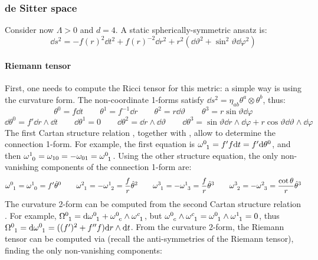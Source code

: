 \subsubsection{de Sitter space}
\label{ssec:dS-space}

Consider now $ \Lambda > 0 $ and $ d = 4 $. A static spherically-symmetric ansatz is:
\begin{equation*}
  \dd s^2 = - f(r)^2 \dd t^2 + f(r)^{-2} \dd r^2 + r^2 (\dd \vartheta^2 + \sin^2 \vartheta \dd \varphi^2)
\end{equation*}

\paragraph{Riemann tensor}

First, one needs to compute the Ricci tensor for this metric: a simple way is using the curvature form. The non-coordinate 1-forms satisfy $ \dd s^2 = \eta_{ab} \theta^a \otimes \theta^b $, thus:
\begin{equation*}
  \theta^0 = f \dd t
  \qquad
  \theta^1 = f^{-1} \dd r
  \qquad
  \theta^2 = r \dd \vartheta
  \qquad
  \theta^3 = r \sin \vartheta \dd \varphi
\end{equation*}
\begin{equation*}
  \dd\theta^0 = f' \dd r \wedge \dd t
  \qquad
  \dd\theta^1 = 0
  \qquad
  \dd\theta^2 = \dd r \wedge \dd \vartheta
  \qquad
  \dd\theta^3 = \sin \vartheta \dd r \wedge \dd \varphi + r \cos \vartheta \dd \vartheta \wedge \dd \varphi
\end{equation*}
The first Cartan structure relation , together with , allow to determine the connection 1-form. For example, the first equation is $ \tensor{\omega}{^0_1} = f' f \dd t = f' \dd \theta^0 $, and then $ \tensor{\omega}{^1_0} = \omega_{10} = - \omega_{01} = \tensor{\omega}{^0_1} $. Using the other structure equation, the only non-vanishing components of the connection 1-form are:
\begin{equation*}
  \tensor{\omega}{^0_1} = \tensor{\omega}{^1_0} = f' \hat{\theta}^0
  \qquad
  \tensor{\omega}{^2_1} = - \tensor{\omega}{^1_2} = \frac{f}{r} \hat{\theta}^2
  \qquad
  \tensor{\omega}{^3_1} = - \tensor{\omega}{^1_3} = \frac{f}{r} \hat{\theta}^3
  \qquad
  \tensor{\omega}{^3_2} = - \tensor{\omega}{^2_3} = \frac{\cot \theta}{r} \hat{\theta}^3
\end{equation*}
The curvature 2-form can be computed from the second Cartan structure relation . For example, $ \tensor{\Omega}{^0_1} = \dd \tensor{\omega}{^0_1} + \tensor{\omega}{^0_c} \wedge \tensor{\omega}{^c_1} $, but $ \tensor{\omega}{^0_c} \wedge \tensor{\omega}{^c_1} = \tensor{\omega}{^0_1} \wedge \tensor{\omega}{^1_1} = 0 $, thus $ \tensor{\Omega}{^0_1} = \dd \tensor{\omega}{^0_1} = ( (f')^2 + f'' f) \dd r \wedge \dd t $. From the curvature 2-form, the Riemann tensor can be computed via  (recall the anti-symmetries of the Riemann tensor), finding the only non-vanishing components:
